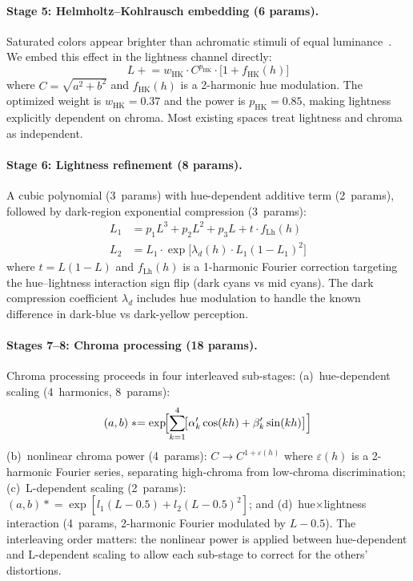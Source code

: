 \documentclass[11pt, twocolumn]{article}
\begin{document}
\paragraph{Stage 5: Helmholtz--Kohlrausch embedding (6 params).}
Saturated colors appear brighter than achromatic stimuli of equal
luminance~\cite{cie1976}. We embed this effect in the lightness
channel directly:
\begin{equation}
  L \mathrel{+}= w_\mathrm{HK} \cdot C^{p_\mathrm{HK}} \cdot \bigl[1 + f_\mathrm{HK}(h)\bigr]
  \label{eq:hk}
\end{equation}
where $C = \sqrt{a^2+b^2}$ and $f_\mathrm{HK}(h)$ is a 2-harmonic
hue modulation. The optimized weight is $w_\mathrm{HK} = 0.37$ and
the power is $p_\mathrm{HK} = 0.85$, making lightness explicitly
dependent on chroma. Most existing spaces treat lightness and chroma
as independent.

\paragraph{Stage 6: Lightness refinement (8 params).}
A cubic polynomial (3~params) with hue-dependent additive term
(2~params), followed by dark-region exponential compression (3~params):
\begin{align}
  L_1 &= p_1 L^3 + p_2 L^2 + p_3 L + t \cdot f_\mathrm{Lh}(h) \\
  L_2 &= L_1 \cdot \exp\!\bigl[\lambda_d(h) \cdot L_1(1-L_1)^2\bigr]
\end{align}
where $t = L(1-L)$ and $f_\mathrm{Lh}(h)$ is a 1-harmonic Fourier
correction targeting the hue--lightness interaction sign flip (dark
cyans vs mid cyans). The dark compression coefficient $\lambda_d$
includes hue modulation to handle the known difference in dark-blue
vs dark-yellow perception.

\paragraph{Stages 7--8: Chroma processing (18 params).}
Chroma processing proceeds in four interleaved sub-stages:
(a)~hue-dependent scaling (4~harmonics, 8~params):
\begin{equation}
  (a,b) \mathrel{*}= \exp\!\Bigl[\sum_{k=1}^{4}\!\bigl[\alpha'_k\cos(kh) + \beta'_k\sin(kh)\bigr]\Bigr]
\end{equation}
(b)~nonlinear chroma power (4~params): $C \to C^{1+\varepsilon(h)}$
where $\varepsilon(h)$ is a 2-harmonic Fourier series, separating
high-chroma from low-chroma discrimination;
(c)~L-dependent scaling (2~params):
$(a,b) \mathrel{*}= \exp[l_1(L-0.5) + l_2(L-0.5)^2]$; and
(d)~hue$\times$lightness interaction (4~params, 2-harmonic Fourier
modulated by $L-0.5$). The interleaving order matters: the nonlinear
power is applied between hue-dependent and L-dependent scaling to
allow each sub-stage to correct for the others' distortions.
\end{document}

